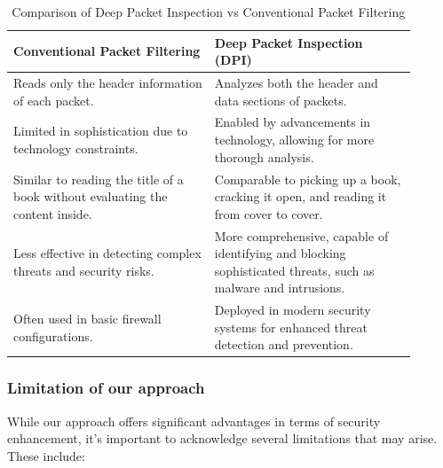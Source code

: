 \documentclass[12pt,letterpaper]{article}
\begin{document}
        \begin{table}[ht]
            \centering
            \caption{Comparison of Deep Packet Inspection vs Conventional Packet Filtering}
            \label{table:comparison}
            \begin{tabular}{p{0.45\linewidth} p{0.45\linewidth}}
                \toprule
            \textbf{Conventional Packet Filtering} & \textbf{Deep Packet Inspection (DPI)} \\
            \midrule
            Reads only the header information of each packet. & Analyzes both the header and data sections of packets. \\
            
            Limited in sophistication due to technology constraints. & Enabled by advancements in technology, allowing for more thorough analysis. \\
            
            Similar to reading the title of a book without evaluating the content inside. & Comparable to picking up a book, cracking it open, and reading it from cover to cover. \\
            
            Less effective in detecting complex threats and security risks. & More comprehensive, capable of identifying and blocking sophisticated threats, such as malware and intrusions. \\
            
            Often used in basic firewall configurations. & Deployed in modern security systems for enhanced threat detection and prevention. \\
        \bottomrule
    \end{tabular}
\end{table}


        \subsubsection{Limitation of our approach}

            While our approach offers significant advantages in terms of security enhancement, it's important to acknowledge several limitations that may arise. These include:
\end{document}
